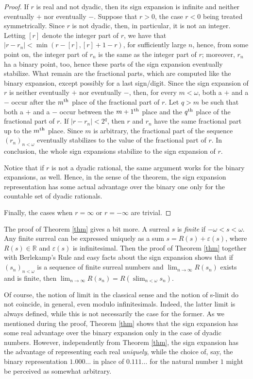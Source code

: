 \documentclass[12pt]{amsart}
\theoremstyle{definition}
\theoremstyle{remark}
\begin{document}
\begin{proof}
If $r$ is real and not dyadic, 
then its sign expansion is infinite and
 neither eventually $+$ nor eventually $-$.
Suppose that $r>0$, the case $r<0$ being treated symmetrically.
Since $r$ is not dyadic, then, in particular, it is not an integer.
Letting $[r]$ denote the integer part of $r$,
we have that $|r-r_n| < \min(r-[r], [r]+1-r)$,
for sufficiently large $n$, 
hence, from some point on, the integer part of  $r_n$
 is the same as the integer part of $r$; moreover, $r_n$
ha a binary point, too, hence these
parts of the sign expansion eventually stabilize. 
What remain are  the fractional parts, 
which are computed like the binary expansion, except possibly for 
a last sign/digit. Since the sign 
expansion of $r$ is neither eventually $+$ nor eventually $-$,
then, for every $ m < \omega$, both a $+$ and a $-$ occur
after the $m^{\rm th}$ place of the fractional part of $r$.
Let $q > m$ be such that both  a $+$ and a $-$ occur
between the  $m+1^{\rm th}$ place and
the $q^{\rm th}$ place of the fractional part of $r$. If 
 $|r-r_n| < 2^q$, then
$r$ and $r_n$ have the same fractional part up to the
$m^{\rm th}$ place.
Since $m$ is arbitrary,
the fractional part of the sequence  
$( r_n) _{n < \omega } $  eventually stabilizes to the
value of the fractional part of $r$.
In conclusion, the whole sign expansions stabilize
to the sign expansion of $r$.  
 
Notice that if $r$ is not  a dyadic rational, the same argument works
for the binary expansions, as well. Hence,
in the sense of the theorem,
the sign expansion representation has
 some
actual advantage 
over the binary one
 only for the countable set
of dyadic rationals.

Finally, the cases when $r=\infty$ or  
$r=-\infty$ are trivial.
 \end{proof}  

The proof of Theorem \ref{thm} gives a bit more.
A surreal $s$ is \emph{finite}  if $ -\omega < s < \omega $.
Any finite surreal can be expressed uniquely as a sum
$s= R(s) + \varepsilon(s) $,
where  
$ R(s)\in \mathbb R $ and $  \varepsilon(s)$ is infinitesimal.
Then the proof of Theorem \ref{thm} together
with  Berlekamp's  Rule and easy facts about
the sign expansion shows that
if $( s_n) _{n < \omega } $ 
is a sequence of finite surreal numbers
and 
$\lim_{n\to\infty}  R(s_n) $
exists and is finite,
then
$\lim_{n\to\infty}  R(s_n)  = R(\operatorname{slim}_{n < \omega } s_n )$.

Of course, the notion of limit in the classical sense
and the notion of s-limit do not coincide, in general,
even modulo infinitesimals.
Indeed, the latter limit is always defined, while this is not
necessarily the case for the former.
As we mentioned during the proof, Theorem \ref{thm}
shows that  the sign expansion has some real advantage
 over the binary expansion only in the case of dyadic numbers.
However, independently from Theorem \ref{thm}, the sign expansion has the advantage of  representing
each real \emph{uniquely},
while the choice of, say, the binary representation
$1.000\dots$ in place of $0.111\dots$ for the natural number $1$ 
might be perceived as somewhat
arbitrary.  
\end{document}
